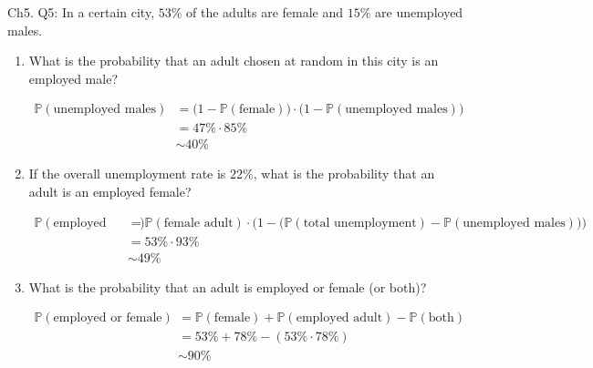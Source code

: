 \documentclass[12pt]{article}
\begin{document}

\noindent
Ch5. Q5: In a certain city, $53\%$ of the adults are female and $15\%$ are unemployed males.

\begin{center}
\begin{enumerate}[label=(\alph*)]
\item What is the probability that an adult chosen at random in this city is an employed male?

\begin{align*}
\mathbb{P}(\text{unemployed males}) & = \big ( 1-\mathbb{P}(\text{female}) \big ) \cdot \big ( 1 - \mathbb{P}(\text{unemployed males}) \big ) \\
& = 47 \% \cdot 85 \% \\
& \sim 40 \%
\end{align*}

\item If the overall unemployment rate is $22\%$, what is the probability that an adult is an employed female?

\begin{align*}
\mathbb{P}(\text{employed female}) & = \mathbb{P}(\text{female adult}) \cdot \Big (1 - \big ( \mathbb{P}(\text{total unemployment}) - \mathbb{P}(\text{unemployed males}) \big ) \Big ) \\
& = 53\% \cdot 93\% \\
& \sim 49 \%
\end{align*}

\item What is the probability that an adult is employed or female (or both)?

\begin{align*}
\mathbb{P}(\text{employed or female}) & = \mathbb{P}(\text{female}) + \mathbb{P}(\text{employed adult}) - \mathbb{P}(\text{both}) \\
& = 53\% + 78\% - (53\% \cdot 78\%) \\
& \sim 90 \%
\end{align*}

\end{enumerate}
\end{center}

\vspace{.5cm}
\end{document}
